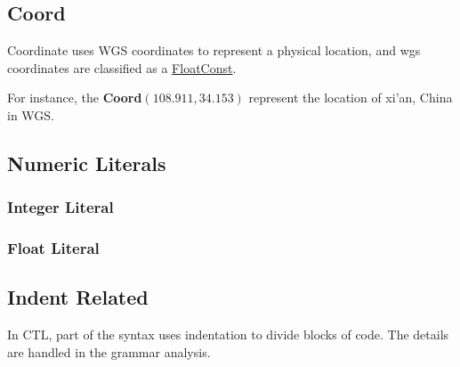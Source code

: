 \subsection{Coord} \label{Coord}
Coordinate uses WGS coordinates to represent a physical location, and wgs coordinates are classified as a \hyperref[FloatConst]{FloatConst}.
\begin{grammar}
\end{grammar}
For instance, the \textbf{Coord}$(108.911, 34.153)$ represent the location of  xi'an, China in WGS.

\subsection{Numeric Literals}\label{FloatConst}\label{IntConst}
\subsubsection{Integer Literal}
\begin{grammar}
     \label{DecimalLiteral}
    \label{HexLiteral}
    \label{OctLiteral}
\end{grammar}
\subsubsection{Float Literal}
\begin{grammar}
         \label{FloatLiteral}
     \label{HexFloatLiteral}
\end{grammar}


\subsection{Indent Related}\label{NEWLINE}\label{INDENT}\label{DEDENT}
In CTL, part of the syntax uses indentation to divide blocks of code. The details are handled in the grammar analysis.


